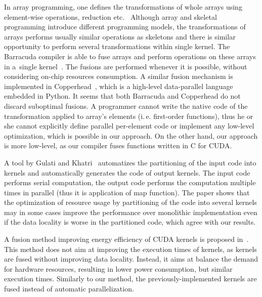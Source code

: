 \documentclass[final]{siamltex}
\def\ie{i.\,e.}
\begin{document}
In array programming, one defines the transformations of whole arrays using element-wise operations, reduction etc.~\cite{iverson1962programming} Although array and skeletal programming introduce different programming models, the transformations of arrays performs usually similar operations as skeletons and there is similar opportunity to perform several transformations within single kernel. The Barracuda compiler is able to fuse arrays and perform operations on these arrays in a~single kernel~\cite{larsen2011simple}. The fusions are performed whenever it is possible, without considering on-chip resources consumption. A similar fusion mechanism is implemented in Copperhead~\cite{catanzaro2011copperhead}, which is a high-level data-parallel language embedded in Python. It seems that both Barracuda and Copperhead do not discard suboptimal fusions. A programmer cannot write the native code of the transformation applied to array's elements (\ie{} first-order functions), thus he or she cannot explicitly define parallel per-element code or implement any low-level optimization, which is possible in our approach. On the other hand, our approach is more low-level, as our compiler fuses functions written in C for CUDA.

A tool by Gulati and Khatri~\cite{gulati2009automated} automatizes the partitioning of the input code into kernels and automatically generates the code of output kernels. The input code performs serial computation, the output code performs the computation multiple times in parallel (thus it is application of map function). The paper shows that the optimization of resource usage by partitioning of the code into several kernels may in some cases improve the performance over monolithic implementation even if the data locality is worse in the partitioned code, which agree with our results.

A fusion method improving energy efficiency of CUDA kernels is proposed in~\cite{wang2010kernel}. This method does not aim at improving the execution times of kernels, as kernels are fused without improving data locality. Instead, it aims at balance the demand for hardware resources, resulting in lower power consumption, but similar execution times. Similarly to our method, the previously-implemented kernels are fused instead of automatic parallelization.
\end{document}
